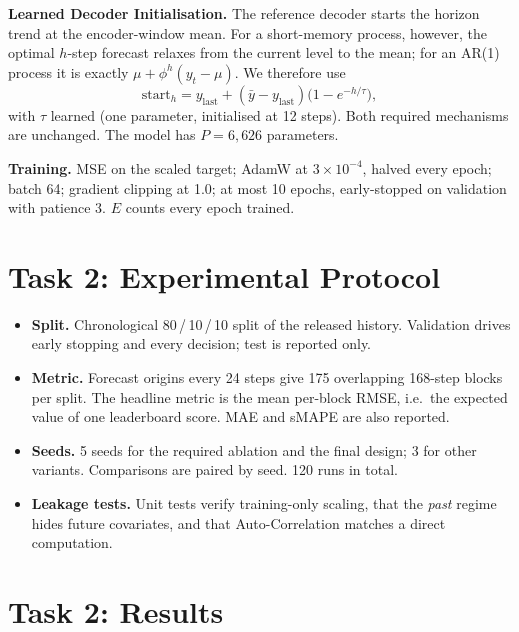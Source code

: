 \documentclass[11pt,a4paper]{article}
\begin{document}
\noindent\textbf{Learned Decoder Initialisation.} The reference decoder starts the horizon trend at the encoder-window mean. For a short-memory process, however, the optimal $h$-step forecast relaxes from the current level to the mean; for an AR(1) process it is exactly $\mu+\phi^h(y_t-\mu)$. We therefore use
\begin{equation}
\text{start}_h=y_{\text{last}}+(\bar y-y_{\text{last}})\bigl(1-e^{-h/\tau}\bigr),
\label{eq:decay}
\end{equation}
with $\tau$ learned (one parameter, initialised at 12 steps). Both required mechanisms are unchanged. The model has $P=6{,}626$ parameters.

\textbf{Training.} MSE on the scaled target; AdamW at $3\times10^{-4}$, halved every epoch; batch 64; gradient clipping at 1.0; at most 10 epochs, early-stopped on validation with patience 3. $E$ counts every epoch trained.

\section{Task 2: Experimental Protocol}
\begin{itemize}
  \item \textbf{Split.} Chronological 80\,/\,10\,/\,10 split of the released history. Validation drives early stopping and every decision; test is reported only.
  \item \textbf{Metric.} Forecast origins every 24 steps give 175 overlapping 168-step blocks per split. The headline metric is the mean per-block RMSE, i.e.\ the expected value of one leaderboard score. MAE and sMAPE are also reported.
  \item \textbf{Seeds.} 5 seeds for the required ablation and the final design; 3 for other variants. Comparisons are paired by seed. 120 runs in total.
  \item \textbf{Leakage tests.} Unit tests verify training-only scaling, that the \emph{past} regime hides future covariates, and that Auto-Correlation matches a direct computation.
\end{itemize}

\section{Task 2: Results}
\end{document}
